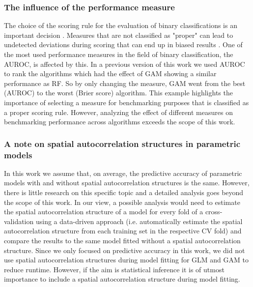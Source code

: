 \documentclass[review]{elsarticle}
\begin{document}
\subsubsection{The influence of the performance measure}
The choice of the scoring rule for the evaluation of binary classifications is an important decision \citep{Gneiting2007}.
Measures that are not classified as "proper" can lead to undetected deviations during scoring that can end up in biased results \citep{Byrne2016}.
One of the most used performance measures in the field of binary classification, the \ac{AUROC}, is affected by this.
In a previous version of this work we used \ac{AUROC} to rank the algorithms which had the effect of GAM showing a similar performance as RF.
So by only changing the measure, GAM went from the best (AUROC) to the worst (Brier score) algorithm.
This example highlights the importance of selecting a measure for benchmarking purposes that is classified as a proper scoring rule.
However, analyzing the effect of different measures on benchmarking performance across algorithms exceeds the scope of this work.

\subsubsection{A note on spatial autocorrelation structures in parametric models}
In this work we assume that, on average, the predictive accuracy of parametric models with and without spatial autocorrelation structures is the same.
However, there is little research on this specific topic \citep{Dormann2007b, Mets2017} and a detailed analysis goes beyond the scope of this work.
In our view, a possible analysis would need to estimate the spatial autocorrelation structure of a model for every fold of a cross-validation using a data-driven approach (i.e. automatically estimate the spatial autocorrelation structure from each training set in the respective CV fold) and compare the results to the same model fitted without a spatial autocorrelation structure.
Since we only focused on predictive accuracy in this work, we did not use spatial autocorrelation structures during model fitting for \ac{GLM} and \ac{GAM} to reduce runtime.
However, if the aim is statistical inference it is of utmost importance to include a spatial autocorrelation structure during model fitting.
\end{document}
